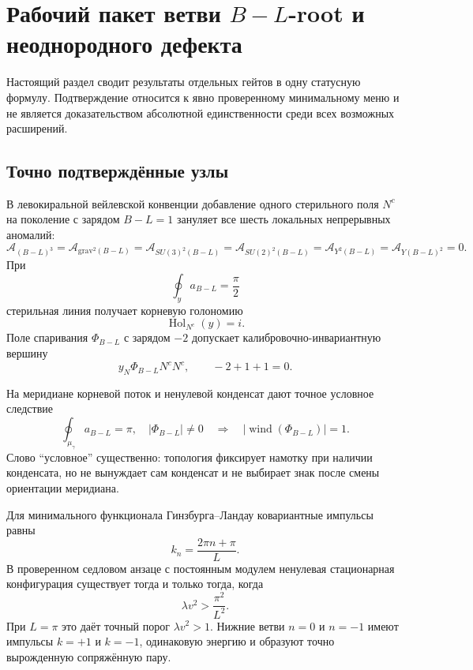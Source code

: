 \chapter{Рабочий пакет ветви \texorpdfstring{\(B-L\)}{B-L}-root и неоднородного дефекта}

Настоящий раздел сводит результаты отдельных гейтов в одну статусную
формулу. Подтверждение относится к явно проверенному минимальному меню и не
является доказательством абсолютной единственности среди всех возможных
расширений.

\section{Точно подтверждённые узлы}

В левокиральной вейлевской конвенции добавление одного стерильного поля
\(N^c\) на поколение с зарядом \(B-L=1\) зануляет все шесть локальных
непрерывных аномалий:
\begin{equation}
 \mathcal A_{(B-L)^3}=\mathcal A_{\mathrm{grav}^2(B-L)}
 =\mathcal A_{SU(3)^2(B-L)}=\mathcal A_{SU(2)^2(B-L)}
 =\mathcal A_{Y^2(B-L)}=\mathcal A_{Y(B-L)^2}=0.
\end{equation}
При
\begin{equation}
 \oint_y a_{B-L}=\frac{\pi}{2}
\end{equation}
стерильная линия получает корневую голономию
\begin{equation}
 \operatorname{Hol}_{N^c}(y)=i.
\end{equation}
Поле спаривания \(\Phi_{B-L}\) с зарядом \(-2\) допускает
калибровочно-инвариантную вершину
\begin{equation}
 y_N\Phi_{B-L}N^cN^c,
 \qquad -2+1+1=0.
\end{equation}

На меридиане корневой поток и ненулевой конденсат дают точное условное
следствие
\begin{equation}
 \oint_{\mu_\gamma}a_{B-L}=\pi,\quad |\Phi_{B-L}|\neq0
 \quad\Longrightarrow\quad
 \left|\operatorname{wind}(\Phi_{B-L})\right|=1.
\end{equation}
Слово ``условное'' существенно: топология фиксирует намотку при наличии
конденсата, но не вынуждает сам конденсат и не выбирает знак после смены
ориентации меридиана.

Для минимального функционала Гинзбурга--Ландау ковариантные импульсы равны
\begin{equation}
 k_n=\frac{2\pi n+\pi}{L}.
\end{equation}
В проверенном седловом анзаце с постоянным модулем ненулевая стационарная
конфигурация существует тогда и только тогда, когда
\begin{equation}
 \lambda v^2>\frac{\pi^2}{L^2}.
\end{equation}
При \(L=\pi\) это даёт точный порог \(\lambda v^2>1\). Нижние ветви
\(n=0\) и \(n=-1\) имеют импульсы \(k=+1\) и \(k=-1\), одинаковую энергию
и образуют точно вырожденную сопряжённую пару.

